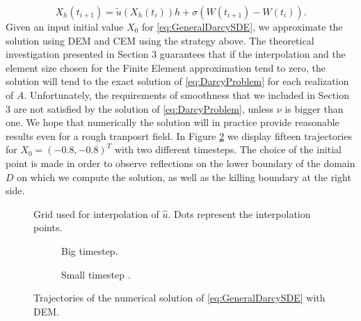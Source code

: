 \begin{equation}\label{eq:DEMDarcy}
	X_h(t_{i+1}) = \tilde{u}(X_h(t_i)) h + \sigma (W(t_{i+1}) - W(t_i)).
\end{equation}
Given an input initial value $X_0$ for \eqref{eq:GeneralDarcySDE}, we approximate the solution using DEM and CEM using the strategy above. The theoretical investigation presented in Section 3 guarantees that if the interpolation and the element size chosen for the Finite Element approximation tend to zero, the solution will tend to the exact solution of \eqref{eq:DarcyProblem} for each realization of $A$. Unfortunately, the requirements of smoothness that we included in Section 3 are not satisfied by the solution of \eqref{eq:DarcyProblem}, unless $\nu$ is bigger than one. We hope that numerically the solution will in practice provide reasonable results even for a rough tranposrt field. In Figure \ref{fig:TrajSDEDarcy} we display fifteen trajectories for $X_0 = (-0.8,-0.8)^T$ with two different timesteps. The choice of the initial point is made in order to observe reflections on the lower boundary of the domain $D$ on which we compute the solution, as well as the killing boundary at the right side. 

\begin{figure}[t]
    \centering
    \resizebox{0.6\linewidth}{!}{ }  
    \caption{Grid used for interpolation of $\hat{u}$. Dots represent the interpolation points.}
    \label{fig:GridVelocity}
\end{figure}

\begin{figure}[t]
    \centering
    \begin{subfigure}{0.49\linewidth}
        \centering
        \resizebox{1\linewidth}{!}{ }  
        \caption{Big timestep.}
    \end{subfigure}
    \begin{subfigure}{0.49\linewidth}
        \centering
        \resizebox{1\linewidth}{!}{ }  
        \caption{Small timestep .}
    \end{subfigure}    
    \caption{Trajectories of the numerical solution of \eqref{eq:GeneralDarcySDE} with DEM.}
    \label{fig:TrajSDEDarcy}
\end{figure}

